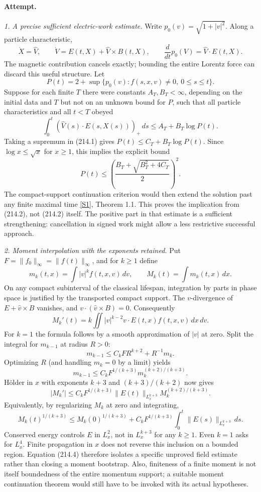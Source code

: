 \documentclass[11pt,a4paper]{article}
\newcommand{\sref}[2]{\hyperlink{source:#1:#2}{[S#2]}}
\begin{document}
\paragraph{Attempt.}
\textit{1. A precise sufficient electric-work estimate.}
Write $p_0(v)=\sqrt{1+|v|^2}$. Along a particle characteristic,
\[
 \dot X=\widehat V,\qquad \dot V=E(t,X)+\widehat V\times B(t,X),
 \qquad \frac{d}{dt}p_0(V)=\widehat V\cdot E(t,X).              \tag{214.1}
\]
The magnetic contribution cancels exactly; bounding the entire Lorentz force
can discard this useful structure. Let
\[
 P(t)=2+\sup\{p_0(v):f(s,x,v)\ne0,\ 0\le s\le t\}.
\]
Suppose for each finite $T$ there were constants $A_T,B_T<\infty$, depending
on the initial data and $T$ but not on an unknown bound for $P$, such that
all particle characteristics and all $t<T$ obeyed
\[
 \int_0^t(\widehat V(s)\cdot E(s,X(s)))_+\,ds
       \le A_T+B_T\log P(t).                                 \tag{214.2}
\]
Taking a supremum in (214.1) gives $P(t)\le C_T+B_T\log P(t)$.
Since $\log x\le\sqrt x$ for $x\ge1$, this implies the explicit bound
\[
 P(t)\le\left(\frac{B_T+\sqrt{B_T^2+4C_T}}2\right)^2.
\]
The compact-support continuation criterion would then extend the solution
past any finite maximal time \sref{214}{1}, Theorem 1.1. This proves the
implication from (214.2), not (214.2) itself. The positive part in that
estimate is a sufficient strengthening: cancellation in signed work might
allow a less restrictive successful approach.

\textit{2. Moment interpolation with the exponents retained.}
Put $F=\|f_0\|_\infty=\|f(t)\|_\infty$, and for $k\ge1$ define
\[
 m_k(t,x)=\int|v|^k f(t,x,v)\,dv,\qquad M_k(t)=\int m_k(t,x)\,dx.
\]
On any compact subinterval of the classical lifespan, integration by parts
in phase space is justified by the transported compact support. The
$v$-divergence of $E+\widehat v\times B$ vanishes, and
$v\cdot(\widehat v\times B)=0$. Consequently
\[
 M_k'(t)=k\iint |v|^{k-2}v\cdot E(t,x)f(t,x,v)\,dx\,dv.
                                                               \tag{214.3}
\]
For $k=1$ the formula follows by a smooth approximation of $|v|$ at zero.
Split the integral for $m_{k-1}$ at radius $R>0$:
\[
 m_{k-1}\le C_k F R^{k+2}+R^{-1}m_k.
\]
Optimizing $R$ (and handling $m_k=0$ by a limit) yields
\[
 m_{k-1}\le C_kF^{1/(k+3)}m_k^{(k+2)/(k+3)}.
\]
H\"older in $x$ with exponents $k+3$ and $(k+3)/(k+2)$ now gives
\[
 |M_k'|\le C_kF^{1/(k+3)}\|E(t)\|_{L^{k+3}_x}
                     M_k^{(k+2)/(k+3)}.
\]
Equivalently, by regularizing $M_k$ at zero and integrating,
\[
 M_k(t)^{1/(k+3)}\le M_k(0)^{1/(k+3)}+
 C_k F^{1/(k+3)}\int_0^t\|E(s)\|_{L^{k+3}_x}\,ds.             \tag{214.4}
\]
Conserved energy controls $E$ in $L^2_x$, not in $L^{k+3}_x$ for any
$k\ge1$. Even $k=1$ asks for $L^4_x$. Finite propagation in $x$ does not
reverse this inclusion on a bounded region. Equation (214.4) therefore
isolates a specific unproved field estimate rather than closing a moment
bootstrap. Also, finiteness of a finite moment is not itself boundedness of
the entire momentum support; a suitable moment continuation theorem would
still have to be invoked with its actual hypotheses.
\end{document}
